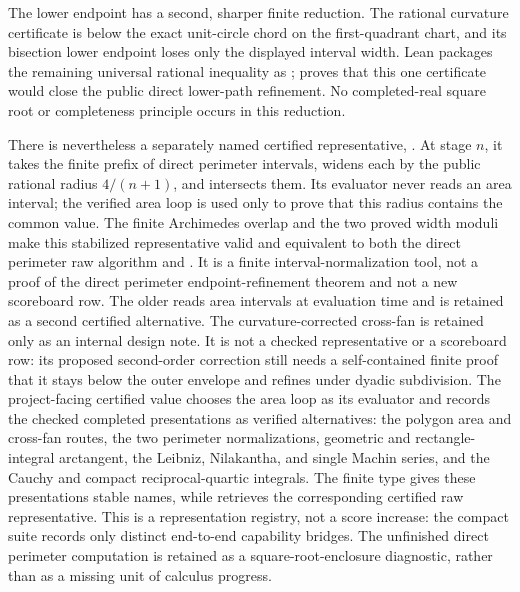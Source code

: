 \begin{theorem}
The lower endpoint has a second, sharper finite reduction.  The rational
curvature certificate  is below the exact
unit-circle chord on the first-quadrant chart, and its bisection lower endpoint
loses only the displayed interval width.  Lean packages the remaining
universal rational inequality as
;
proves that this one certificate would close the public direct lower-path
refinement.  No completed-real square root or completeness principle occurs in
this reduction.

There is nevertheless a separately named certified representative,
. At stage \(n\), it takes the finite prefix
of direct perimeter intervals, widens each by the public rational radius
\(4/(n+1)\), and intersects them. Its evaluator never reads an area interval;
the verified area loop is used only to prove that this radius contains the
common value. The finite Archimedes overlap and the two proved width moduli
make this stabilized representative valid and equivalent to both the direct
perimeter raw algorithm and . It is a finite
interval-normalization tool, not a proof of the direct perimeter
endpoint-refinement theorem and not a new scoreboard row. The older
 reads area intervals at evaluation time and is
retained as a second certified alternative.
The curvature-corrected cross-fan is retained only as an internal design
note.  It is not a checked representative or a scoreboard row: its proposed
second-order correction still needs a self-contained finite proof that it
stays below the outer envelope and refines under dyadic subdivision.
The project-facing certified value  chooses the
area loop as its evaluator and records the checked completed presentations
as verified alternatives: the polygon area and cross-fan routes, the two
perimeter normalizations, geometric and rectangle-integral arctangent, the
Leibniz, Nilakantha, and single Machin series, and the Cauchy and compact
reciprocal-quartic integrals.  The finite type 
gives these presentations stable names, while
 retrieves the corresponding certified
raw representative.  This is a representation registry, not a score increase:
the compact  suite records only distinct
end-to-end capability bridges.  The unfinished direct perimeter computation
is retained as a square-root-enclosure diagnostic, rather than as a missing
unit of calculus progress.
\end{theorem}

